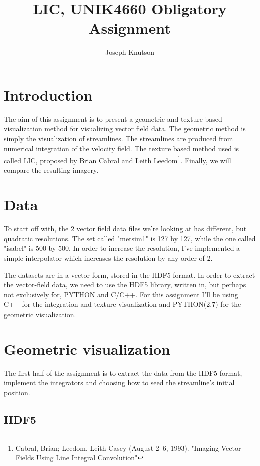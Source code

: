 \documentclass[a4paper,10pt]{report}
\title{LIC, UNIK4660 Obligatory Assignment}
\author{Joseph Knutson}
\begin{document}
\maketitle
\section*{Introduction}
The aim of this assignment is to present a geometric and texture based visualization method for visualizing vector field data. The geometric method is simply the visualization of streamlines. The streamlines are produced from numerical integration of the velocity field.
The texture based method used is called LIC, proposed by Brian Cabral and Leith Leedom\footnote[1]{Cabral, Brian; Leedom, Leith Casey (August 2–6, 1993). "Imaging Vector Fields Using Line Integral Convolution"}. Finally, we will compare the resulting imagery.


\section*{Data}
To start off with, the 2 vector field data files we're looking at has different, but quadratic resolutions. The set called "metsim1" is 127 by 127, while the one called "isabel" is 500 by 500. In order to increase the resolution, I've implemented a simple interpolator which increases the resolution by any order of 2.

The datasets are in a vector form, stored in the HDF5 format. In order to extract the vector-field data, we need to use the HDF5 library, written in, but perhaps not exclusively for, PYTHON and C/C++.
For this assignment I'll be using C++ for the integration and texture visualization and PYTHON(2.7) for the geometric visualization.

\section*{Geometric visualization}
The first half of the assignment is to extract the data from the HDF5 format, implement the integrators and choosing how to seed the streamline's initial position.
\subsection*{HDF5}
\end{document}
